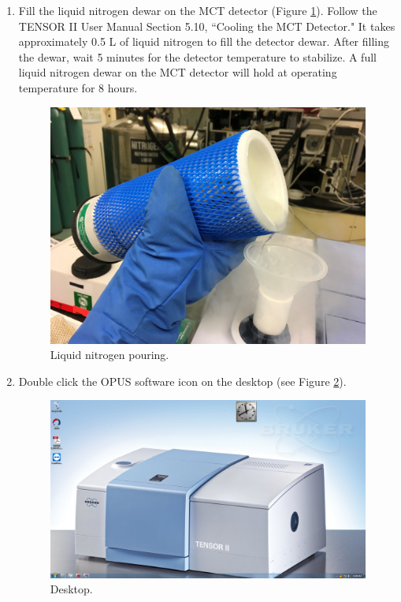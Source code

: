 \begin{enumerate}
    \item Fill the liquid nitrogen dewar on the MCT detector (Figure \ref{N2l}). Follow the TENSOR II User Manual Section 5.10, ``Cooling the MCT Detector." It takes approximately 0.5 L of liquid nitrogen to fill the detector dewar. After filling the dewar, wait 5 minutes for the detector temperature to stabilize. A full liquid nitrogen dewar on the MCT detector will hold at operating temperature for 8 hours.
\begin{figure}[htp]
\begin{center}
\includegraphics[width=6.5in]{pourN2.jpg}
\caption{Liquid nitrogen pouring.}
\label{N2l}
\end{center}
\end{figure}

    \item Double click the OPUS software icon on the desktop (see Figure \ref{desktopicon}).
\begin{figure}[htp]
\begin{center}
\includegraphics[width=6.5in]{desktop.PNG}
\caption{Desktop.}
\label{desktopicon}
\end{center}
\end{figure}


\end{enumerate}
